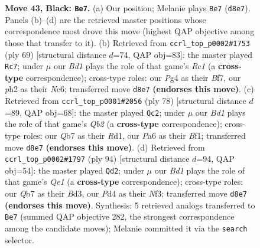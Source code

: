 \documentclass[11pt]{article}
\begin{document}
\begin{figure}[p]
\caption{\textbf{Move 43, Black: \texttt{Be7}.} (a) Our position; Melanie plays \texttt{Be7} (\texttt{d8e7}). Panels (b)--(d) are the retrieved master positions whose correspondence most drove this move (highest QAP objective among those that transfer to it). (b) Retrieved from \texttt{ccrl\_top\_p0002\#1753} (ply 69) [structural distance $d$=74, QAP obj=83]: the master played \texttt{Rc7}; under $\mu$ our \emph{Bd1} plays the role of that game's \emph{Rc1} (a \textbf{cross-type} correspondence); cross-type roles: our \emph{P}g4 as their \emph{B}f7, our \emph{p}h2 as their \emph{N}c6; transferred move \texttt{d8e7} \textbf{(endorses this move)}. (c) Retrieved from \texttt{ccrl\_top\_p0001\#2056} (ply 78) [structural distance $d$=89, QAP obj=68]: the master played \texttt{Qc2}; under $\mu$ our \emph{Bd1} plays the role of that game's \emph{Qb2} (a \textbf{cross-type} correspondence); cross-type roles: our \emph{Q}b7 as their \emph{R}d1, our \emph{P}a6 as their \emph{B}f1; transferred move \texttt{d8e7} \textbf{(endorses this move)}. (d) Retrieved from \texttt{ccrl\_top\_p0002\#1797} (ply 94) [structural distance $d$=94, QAP obj=54]: the master played \texttt{Qd2}; under $\mu$ our \emph{Bd1} plays the role of that game's \emph{Qe1} (a \textbf{cross-type} correspondence); cross-type roles: our \emph{Q}b7 as their \emph{B}d3, our \emph{P}d4 as their \emph{N}f3; transferred move \texttt{d8e7} \textbf{(endorses this move)}. Synthesis: 5 retrieved analogs transferred to \texttt{Be7} (summed QAP objective 282, the strongest correspondence among the candidate moves); Melanie committed it via the \texttt{search} selector.}
\label{fig:thought-m85}
\end{figure}

\clearpage
\end{document}
